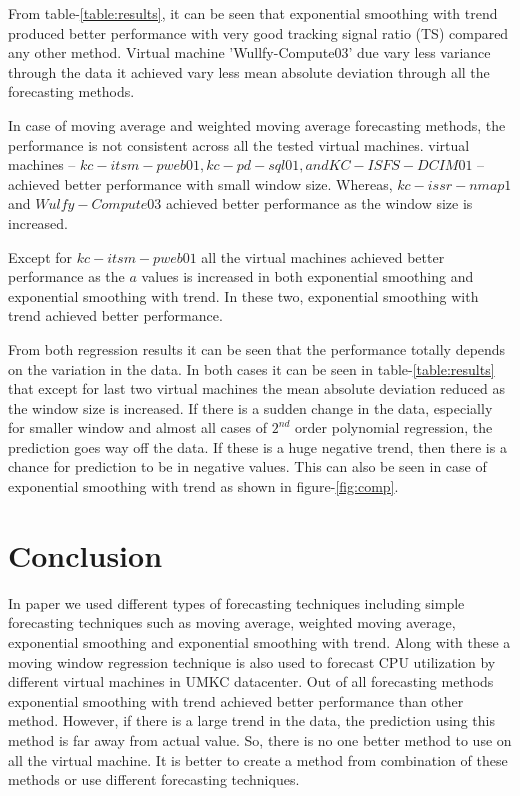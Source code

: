 \documentclass[conference,onecolumn]{IEEEtran}
\begin{document}
From table-\ref{table:results}, it can be seen that exponential smoothing with trend produced better performance with very good tracking signal ratio (TS) compared any other method. Virtual machine 'Wullfy-Compute03' due vary less variance through the data it achieved vary less mean absolute deviation through all the forecasting methods.

In case of moving average and weighted moving average forecasting methods, the performance is not consistent across all the tested virtual machines. virtual machines – $kc-itsm-pweb01, kc-pd-sql01, and KC-ISFS-DCIM01$ – achieved better performance with small window size. Whereas, $kc-issr-nmap1$ and $Wulfy-Compute03$ achieved better performance as the window size is increased. 

Except for $kc-itsm-pweb01$ all the virtual machines achieved better performance as the $a$ values is increased in both exponential smoothing and exponential smoothing with trend. In these two, exponential smoothing with trend achieved better performance.


From both regression results it can be seen that the performance totally depends on the variation in the data. In both cases it can be seen in table-\ref{table:results} that except for last two virtual machines the mean absolute deviation reduced as the window size is increased. If there is a sudden change in the data, especially for smaller window and almost all cases of $2^{nd}$ order polynomial regression, the prediction goes way off the data. If these is a huge negative trend, then there is a chance for prediction to be in negative values. This can also be seen in case of exponential smoothing with trend as shown in figure-\ref{fig:comp}.
\section{Conclusion}

In paper we used different types of forecasting techniques including simple forecasting techniques such as moving average, weighted moving average, exponential smoothing and exponential smoothing with trend. Along with these a moving window regression technique is also used to forecast CPU utilization by different virtual machines in UMKC datacenter. Out of all forecasting methods exponential smoothing with trend achieved better performance than other method. However, if there is a large trend in the data, the prediction using this method is far away from actual value. So, there is no one better method to use on all the virtual machine. It is better to create a method from combination of these methods or use different forecasting techniques.
\end{document}
